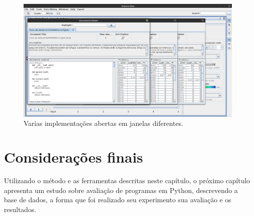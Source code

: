 		\begin{figure}[hb]
			\centering
			\includegraphics[width=.95\linewidth]{imagem/ladoAlado}
			\caption{Varias implementações abertas em janelas diferentes.}
			\label{fig:ladoAlado}
		\end{figure}
		

	\section{Considerações finais}
	
		Utilizando o método e as ferramentas descritas neste capítulo,
		o próximo capítulo apresenta um estudo sobre avaliação de programas em Python,
		descrevendo a base de dados, a forma que foi realizado
		seu experimento sua avaliação e os resultados.

